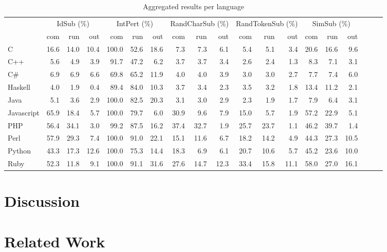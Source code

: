 \documentclass[10pt]{sigplanconf}
\begin{document}
\begin{table*}
\begin{center}
\begin{tabular}{ l r r r r r r r r r r r r r r r r r r }
 & \multicolumn{3}{c}{IdSub (\%)} & \multicolumn{3}{c}{IntPert (\%)} & \multicolumn{3}{c}{RandCharSub (\%)} & \multicolumn{3}{c}{RandTokenSub (\%)} & \multicolumn{3}{c}{SimSub (\%)}\\
 & com & run & out & com & run & out & com & run & out & com & run & out & com & run & out\\
\hline
C & 16.6 & 14.0 & 10.4 & 100.0 & 52.6 & 18.6 & 7.3 & 7.3 & 6.1 & 5.4 & 5.1 & 3.4 & 20.6 & 16.6 & 9.6 \\
C++ & 5.6 & 4.9 & 3.9 & 91.7 & 47.2 & 6.2 & 3.7 & 3.7 & 3.4 & 2.6 & 2.4 & 1.3 & 8.3 & 7.1 & 3.1 \\
C\# & 6.9 & 6.9 & 6.6 & 69.8 & 65.2 & 11.9 & 4.0 & 4.0 & 3.9 & 3.0 & 3.0 & 2.7 & 7.7 & 7.4 & 6.0 \\
Haskell & 4.0 & 1.9 & 0.4 & 89.4 & 84.0 & 10.3 & 3.7 & 3.4 & 2.3 & 3.5 & 3.2 & 1.8 & 13.4 & 11.2 & 2.1 \\
Java & 5.1 & 3.6 & 2.9 & 100.0 & 82.5 & 20.3 & 3.1 & 3.0 & 2.9 & 2.3 & 1.9 & 1.7 & 7.9 & 6.4 & 3.1 \\
Javascript & 65.9 & 18.4 & 5.7 & 100.0 & 79.7 & 6.0 & 30.9 & 9.6 & 7.9 & 15.0 & 5.7 & 1.9 & 57.2 & 22.9 & 5.1 \\
PHP & 56.4 & 34.1 & 3.0 & 99.2 & 87.5 & 16.2 & 37.4 & 32.7 & 1.9 & 25.7 & 23.7 & 1.1 & 46.2 & 39.7 & 1.4 \\
Perl & 57.9 & 29.3 & 7.4 & 100.0 & 91.0 & 22.1 & 15.1 & 11.6 & 6.7 & 18.2 & 14.2 & 4.9 & 44.3 & 27.3 & 10.5 \\
Python & 43.3 & 17.3 & 12.6 & 100.0 & 75.3 & 14.4 & 18.3 & 6.9 & 6.1 & 20.7 & 10.6 & 5.7 & 45.2 & 23.6 & 10.0 \\
Ruby & 52.3 & 11.8 & 9.1 & 100.0 & 91.1 & 31.6 & 27.6 & 14.7 & 12.3 & 33.4 & 15.8 & 11.1 & 58.0 & 27.0 & 16.1 \\
\end{tabular}
\end{center}
\caption{Aggregated results per language}
\label{tbl:aggregated-per-language}
\end{table*}

\section{Discussion} %
\label{sec:discussion}

\section{Related Work} %
\label{sec:related}
\end{document}
